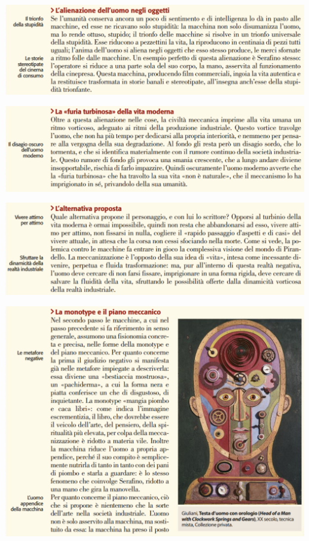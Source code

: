 \documentclass[a4paper, twoside, titlepage]{book}
\begin{document}
\begin{center}
\includegraphics[width=\textwidth]{macchina2}
\end{center}

\begin{center}
\includegraphics[width=\textwidth]{macchina3}
\end{center}

\begin{center}
\includegraphics[width=\textwidth]{macchina4}
\end{center}
\vfill
\begin{center}
\includegraphics[width=\textwidth]{macchina5}
\end{center}
\end{document}
